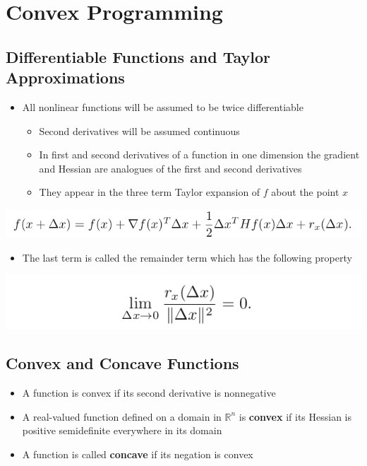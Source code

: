 \documentclass[11pt]{article}
\begin{document}
\section{Convex Programming}
\label{sec:org5799d2e}
\subsection{Differentiable Functions and Taylor Approximations}
\label{sec:org0cfe12e}
\begin{itemize}
\item All nonlinear functions will be assumed to be twice differentiable
\begin{itemize}
\item Second derivatives will be assumed continuous
\item In first and second derivatives of a function in one dimension the gradient and Hessian are analogues of the first and second derivatives
\item They appear in the three term Taylor expansion of \(f\) about the point \(x\)
\end{itemize}
\end{itemize}
\begin{center}
\includegraphics[width=.9\linewidth]{Convex Programming/screenshot_2019-03-17_16-13-20.png}
\end{center}
\begin{itemize}
\item The last term is called the remainder term which has the following property
\end{itemize}
\begin{center}
\includegraphics[width=.9\linewidth]{Convex Programming/screenshot_2019-03-17_16-15-28.png}
\end{center}

\subsection{Convex and Concave Functions}
\label{sec:orgc8f6b77}
\begin{itemize}
\item A function is convex if its second derivative is nonnegative
\item A real-valued function defined on a domain in \(\mathbb R^n\) is \textbf{convex} if its Hessian is positive semidefinite everywhere in its domain
\item A function is called \textbf{concave} if its negation is convex
\end{itemize}
\end{document}

